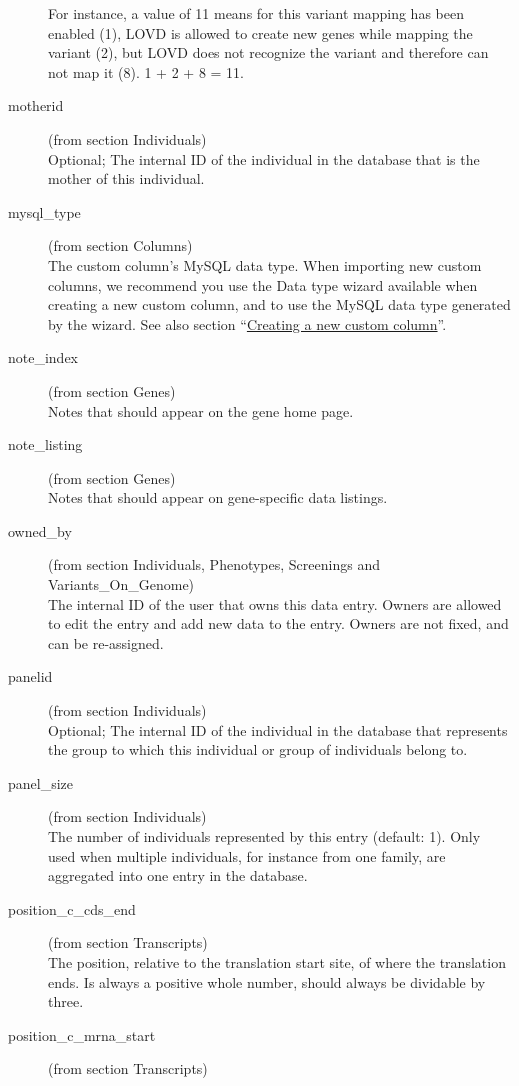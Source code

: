\documentclass[a4paper,oneside,openany,12pt]{memoir}
\begin{document}
\begin{description}
  For instance, a value of 11 means for this variant mapping has been enabled (1), LOVD is allowed to create new genes
    while mapping the variant (2), but LOVD does not recognize the variant and therefore can not map it (8). 1 + 2 + 8
    = 11.
  \item[motherid] (from section Individuals)\hfill \\
  Optional; The internal ID of the individual in the database that is the mother of this individual.
  \item[mysql\_type] (from section Columns)\hfill \\
  The custom column's MySQL data type.
  When importing new custom columns, we recommend you use the Data type wizard available when creating a new custom column, and to use the MySQL data type generated by the wizard.
  See also section ``\hyperlink{sec:custom_column_create}{Creating a new custom column}''.
  \item[note\_index] (from section Genes)\hfill \\
  Notes that should appear on the gene home page.
  \item[note\_listing] (from section Genes)\hfill \\
  Notes that should appear on gene-specific data listings.
  \item[owned\_by] (from section Individuals, Phenotypes, Screenings and Variants\_On\_Genome)\hfill \\
  The internal ID of the user that owns this data entry.
  Owners are allowed to edit the entry and add new data to the entry.
  Owners are not fixed, and can be re-assigned.
  \item[panelid] (from section Individuals)\hfill \\
  Optional; The internal ID of the individual in the database that represents the group to which this individual or group of individuals belong to.
  \item[panel\_size] (from section Individuals)\hfill \\
  The number of individuals represented by this entry (default: 1).
  Only used when multiple individuals, for instance from one family, are aggregated into one entry in the database.
  \item[position\_c\_cds\_end] (from section Transcripts)\hfill \\
  The position, relative to the translation start site, of where the translation ends.
  Is always a positive whole number, should always be dividable by three.
  \item[position\_c\_mrna\_start] (from section Transcripts)\hfill \\

\end{description}
\end{document}
